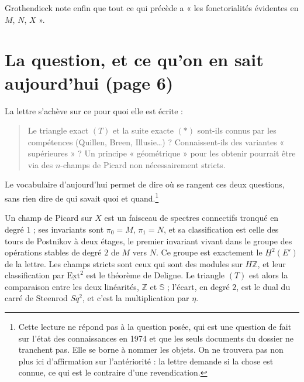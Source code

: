\documentclass[11pt,a4paper]{article}
\begin{document}
Grothendieck note enfin que tout ce qui précède a « les fonctorialités
évidentes en $M$, $N$, $X$ ».

\section*{La question, et ce qu'on en sait aujourd'hui (page 6)}

La lettre s'achève sur ce pour quoi elle est écrite :

\begin{quote}
Le triangle exact $(T)$ et la suite exacte $(*)$ sont-ils connus par les
compétences (Quillen, Breen, Illusie…) ? Connaissent-ils des variantes
« supérieures » ? Un principe « géométrique » pour les obtenir pourrait être
via des $n$-champs de Picard non nécessairement stricts.
\end{quote}

Le vocabulaire d'aujourd'hui permet de dire où se rangent ces deux
questions, sans rien dire de qui savait quoi et quand.\footnote{Cette lecture
ne répond pas à la question posée, qui est une question de fait sur l'état des
connaissances en 1974 et que les seuls documents du dossier ne tranchent
pas. Elle se borne à nommer les objets. On ne trouvera pas non plus ici
d'affirmation sur l'antériorité : la lettre demande si la chose est connue,
ce qui est le contraire d'une revendication.}

Un champ de Picard sur $X$ est un faisceau de spectres connectifs tronqué en
degré $1$ ; ses invariants sont $\pi_0 = M$, $\pi_1 = N$, et sa classification
est celle des tours de Postnikov à deux étages, le premier invariant vivant
dans le groupe des opérations stables de degré $2$ de $M$ vers $N$. Ce groupe
est exactement le $\underline{H}^2(E')$ de la lettre. Les champs stricts sont
ceux qui sont des modules sur $H\mathbb{Z}$, et leur classification par
$\underline{\mathrm{Ext}}^2$ est le théorème de Deligne. Le triangle $(T)$ est
alors la comparaison entre les deux linéarités, $\mathbb{Z}$ et
$\mathbb{S}$ ; l'écart, en degré $2$, est le dual du carré de Steenrod
$Sq^{2}$, et c'est la multiplication par $\eta$.
\end{document}
